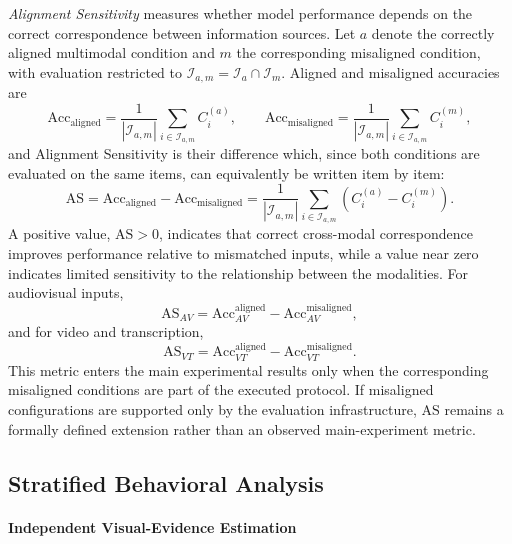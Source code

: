 \begin{description}
\textit{Alignment Sensitivity} measures whether model performance depends on the correct correspondence between information sources. Let \(a\) denote the correctly aligned multimodal condition and \(m\) the corresponding misaligned condition, with evaluation restricted to \(\mathcal{I}_{a,m} = \mathcal{I}_{a} \cap \mathcal{I}_{m}\). Aligned and misaligned accuracies are
\begin{equation}
\mathrm{Acc}_{\mathrm{aligned}}
=
\frac{1}{|\mathcal{I}_{a,m}|}
\sum_{i \in \mathcal{I}_{a,m}}
C_i^{(a)},
\qquad
\mathrm{Acc}_{\mathrm{misaligned}}
=
\frac{1}{|\mathcal{I}_{a,m}|}
\sum_{i \in \mathcal{I}_{a,m}}
C_i^{(m)},
\end{equation}
and Alignment Sensitivity is their difference which, since both conditions are evaluated on the same items, can equivalently be written item by item:
\begin{equation}
\mathrm{AS}
=
\mathrm{Acc}_{\mathrm{aligned}}
-
\mathrm{Acc}_{\mathrm{misaligned}}
=
\frac{1}{|\mathcal{I}_{a,m}|}
\sum_{i \in \mathcal{I}_{a,m}}
\left(
C_i^{(a)}
-
C_i^{(m)}
\right).
\end{equation}
A positive value, \(\mathrm{AS}>0\), indicates that correct cross-modal correspondence improves performance relative to mismatched inputs, while a value near zero indicates limited sensitivity to the relationship between the modalities. For audiovisual inputs,
\begin{equation}
\mathrm{AS}_{AV}
=
\mathrm{Acc}_{AV}^{\mathrm{aligned}}
-
\mathrm{Acc}_{AV}^{\mathrm{misaligned}},
\end{equation}
and for video and transcription,
\begin{equation}
\mathrm{AS}_{VT}
=
\mathrm{Acc}_{VT}^{\mathrm{aligned}}
-
\mathrm{Acc}_{VT}^{\mathrm{misaligned}}.
\end{equation}
This metric enters the main experimental results only when the corresponding misaligned conditions are part of the executed protocol. If misaligned configurations are supported only by the evaluation infrastructure, \(\mathrm{AS}\) remains a formally defined extension rather than an observed main-experiment metric.
\end{description}
\subsection*{Stratified Behavioral Analysis}

\paragraph{Independent Visual-Evidence Estimation}


